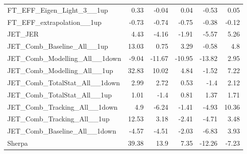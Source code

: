 \begin{table}[htbp]
{\begin{tabular}{lrrrrr}
FT\_EFF\_Eigen\_Light\_3\_\_1up    & 0.33             & -0.04              & 0.04               & -0.53              & 0.05               \\
FT\_EFF\_extrapolation\_\_1up      & -0.73            & -0.74              & -0.75              & -0.38              & -0.12              \\
JET\_JER                           & 4.43             & -4.16              & -1.91              & -5.57              & 5.26               \\
JET\_Comb\_Baseline\_All\_\_1up    & 13.03            & 0.75               & 3.29               & -0.58              & 4.8                \\
JET\_Comb\_Modelling\_All\_\_1down & -9.04            & -11.67             & -10.95             & -13.82             & 2.95               \\
JET\_Comb\_Modelling\_All\_\_1up   & 32.83            & 10.02              & 4.84               & -1.52              & 7.22               \\
JET\_Comb\_TotalStat\_All\_\_1down & 2.99             & 2.72               & 0.53               & -1.4               & 2.12               \\
JET\_Comb\_TotalStat\_All\_\_1up   & 1.01             & -1.4               & 0.81               & 1.37               & 1.71               \\
JET\_Comb\_Tracking\_All\_\_1down  & 4.9              & -6.24              & -1.41              & -4.93              & 10.36              \\
JET\_Comb\_Tracking\_All\_\_1up    & 12.53            & 3.18               & -2.41              & -4.71              & 3.48               \\
JET\_Comb\_Baseline\_All\_\_1down  & -4.57            & -4.51              & -2.03              & -6.83              & 3.93               \\
Sherpa                             & 39.38            & 13.9               & 7.35               & -12.26             & -7.23              \\
\end{tabular}}
\end{table}



\clearpage
\subsection{\mpt}

